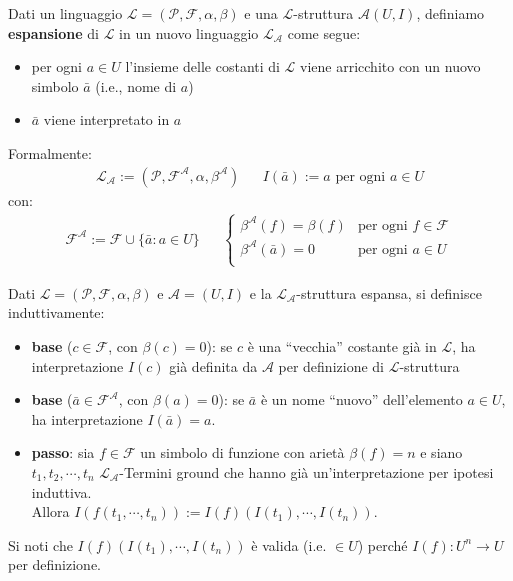 \begin{defi}
Dati un linguaggio $\mathscr{L} = (\mathscr{P}, \mathscr{F}, \alpha, \beta)$ e una $\mathscr{L}$-struttura $\mathscr{A}(U,I)$, definiamo \textbf{espansione} di $\mathscr{L}$ in un nuovo linguaggio $\mathscr{L}_{\mathscr{A}}$ come segue:
\begin{itemize}
  \item per ogni $a \in U$ l'insieme delle costanti di $\mathscr{L}$ viene arricchito con un nuovo simbolo $\bar{a}$ (i.e., nome di $a$)
  \item $\bar a$ viene interpretato in $a$
\end{itemize} 
Formalmente:
\begin{align*}
  \mathscr{L}_{\mathscr{A}} := (\mathscr{P}, \mathscr{F}^{\mathscr{A}}, \alpha, \beta^{\mathscr{A}}) &&
  I(\bar{a}) := a \text{ per ogni } a \in U
\end{align*}
con:
\begin{align*}
  \mathscr{F}^{\mathscr{A}} := \mathscr{F} \cup \{\bar{a}: a \in U\} &&
  \begin{cases}
    \beta^{\mathscr{A}}(f) = \beta(f) & \text{per ogni } f \in \mathscr{F} \\
    \beta^{\mathscr{A}}(\bar{a}) = 0 & \text{per ogni } a \in U \\
  \end{cases}
\end{align*}
\end{defi}

\begin{defi}
Dati $\mathscr{L} = (\mathscr{P}, \mathscr{F}, \alpha, \beta)$ e $\mathscr{A} = (U,I)$ e la $\mathscr{L}_{\mathscr{A}}$-struttura espansa, si definisce induttivamente: 
\begin{itemize}
  \item \textbf{base} ($c \in \mathscr{F}$, con $\beta(c) = 0$): se $c$ è una ``vecchia'' costante già in $\mathscr{L}$, ha interpretazione $I(c)$ già definita da $\mathscr{A}$ per definizione di $\mathscr{L}$-struttura
  \item \textbf{base} ($\bar{a} \in \mathscr{F}^\mathscr{A}$, con $\beta(a) = 0$): se $\bar{a}$ è un nome ``nuovo'' dell'elemento $a \in U$, ha interpretazione $I(\bar{a}) = a$. 
  \item \textbf{passo}: sia $f \in \mathscr{F}$ un simbolo di funzione con arietà $\beta(f) = n$ e siano $t_1, t_2, \cdots, t_n$ $\mathscr{L}_{\mathscr{A}}$-Termini ground che hanno già un'interpretazione per ipotesi induttiva. \\
  Allora $I(f(t_1, \cdots, t_n)):= I(f)(I(t_1), \cdots, I(t_n))$. 
\end{itemize}
\end{defi}
\noindent
Si noti che $I(f)(I(t_1), \cdots, I(t_n))$ è valida (i.e. $\in U$) perché $I(f): U^n \rightarrow U$ per definizione.

